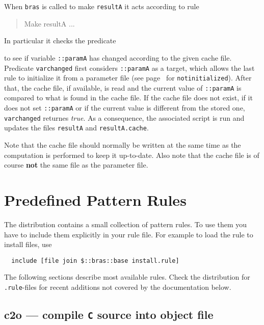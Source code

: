 \documentclass[11pt,bibtotoc,idxtotoc]{scrreprt}
\makeatletter
\newcommand{\bras}{\texttt{bras}}
\newcommand{\indextt}[1]{\index{#1@\texttt{#1}}}
\newcommand{\Indextt}[1]{\texttt{#1}\index{#1@\texttt{#1}}}
\makeatother
\begin{document}
\begin{Describe}
  When \bras{} is called to make \texttt{resultA} it acts according to
  rule 
  \begin{quote}
    \ttfamily Make resultA ...
  \end{quote}
  In particular it checks the predicate 
  \begin{quote}
  \end{quote}
  to see if variable \texttt{::paramA} has changed according to the
  given cache file. Predicate \texttt{varchanged} first
  considers \texttt{::paramA} as a target, which allows the last rule
  to initialize it from a parameter file (see
  page~\pageref{pred:notinitialized} for
  \texttt{notinitialized}). After that, the cache file, if available,
  is read and the current value of \texttt{::paramA} is compared to
  what is found in the cache file. If the cache file does not exist,
  if it does not set \texttt{::paramA} or if the current value is
  different from the stored one, \texttt{varchanged} returnes
  \textit{true}. As a consequence, the associated script is run and
  updates the files \texttt{resultA} and \texttt{resultA.cache}.

  Note that the cache file should normally be written at the same time 
  as the computation is performed to keep it up-to-date. Also note
  that the cache file is of course \textbf{not} the same file as the
  parameter file.
\end{Describe}
\section{Predefined Pattern Rules}
\label{sec:rules}
The distribution contains a  small collection of pattern
rules. To use them you have to include them explicitly in your rule
file. For example to load the rule to install files, use
\begin{verbatim}
  include [file join $::bras::base install.rule]
\end{verbatim}
The following sections describe most available rules. Check the
distribution for \Indextt{.rule}-files for recent additions not covered
by the documentation below.

\subsection{c2o --- compile \Indextt{C} source into object file}
\label{sec:c2o}
\indextt{c2o}
\end{document}
